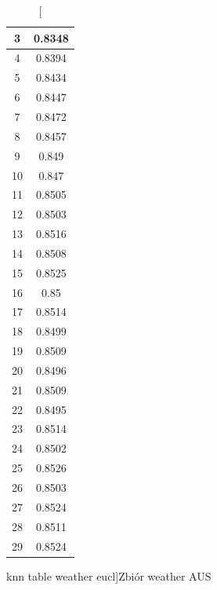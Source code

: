 \documentclass{classrep}
\begin{document}
{{{\begin{table}[!htbp]
\begin{minipage}{.3\textwidth}
\begin{tabular}{|c|c|}
                            3 & 0.8348 \\ \hline
                            4 & 0.8394 \\ \hline
                            5 & 0.8434 \\ \hline
                            6 & 0.8447 \\ \hline
                            7 & 0.8472 \\ \hline
                            8 & 0.8457 \\ \hline
                            9 & 0.849 \\ \hline
                            10 & 0.847 \\ \hline
                            11 & 0.8505 \\ \hline
                            12 & 0.8503 \\ \hline
                            13 & 0.8516 \\ \hline
                            14 & 0.8508 \\ \hline
                            15 & 0.8525 \\ \hline
                            16 & 0.85 \\ \hline
                            17 & 0.8514 \\ \hline
                            18 & 0.8499 \\ \hline
                            19 & 0.8509 \\ \hline
                            20 & 0.8496 \\ \hline
                            21 & 0.8509 \\ \hline
                            22 & 0.8495 \\ \hline
                            23 & 0.8514 \\ \hline
                            24 & 0.8502 \\ \hline
                            25 & 0.8526 \\ \hline
                            26 & 0.8503 \\ \hline
                            27 & 0.8524 \\ \hline
                            28 & 0.8511 \\ \hline
                            29 & 0.8524 \\ \hline
                        \end{tabular}
                        \caption
                        [knn table weather eucl]{Zbiór weather AUS}
                        \label{knn_table_weather_eucl}
                    \end{minipage}
                \end{table}
                \FloatBarrier

}}}
\end{document}
